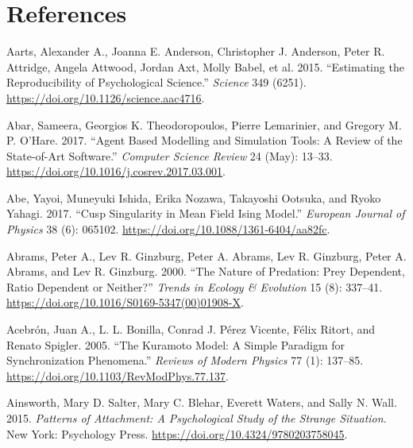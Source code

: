 \documentclass[
  a4paper,
  DIV=11,
  numbers=noendperiod,
  oneside]{scrreprt}
\newlength{\cslhangindent}
\newlength{\cslentryspacingunit} %
\newenvironment{CSLReferences}[2] %
 {%
  \setlength{\parindent}{0pt}
  \ifodd #1
  \let\oldpar\par
  \def\par{\hangindent=\cslhangindent\oldpar}
  \fi
  \setlength{\parskip}{#2\cslentryspacingunit}
 }%
 {}
\begin{document}
\hypertarget{references}{%
\chapter*{References}\label{references}}


\hypertarget{refs}{}
\begin{CSLReferences}{1}{0}
\leavevmode{}%
Aarts, Alexander A., Joanna E. Anderson, Christopher J. Anderson, Peter
R. Attridge, Angela Attwood, Jordan Axt, Molly Babel, et al. 2015.
{``Estimating the Reproducibility of Psychological Science.''}
\emph{Science} 349 (6251).
\url{https://doi.org/10.1126/science.aac4716}.

\leavevmode{}%
Abar, Sameera, Georgios K. Theodoropoulos, Pierre Lemarinier, and
Gregory M. P. O'Hare. 2017. {``Agent {Based Modelling} and {Simulation}
Tools: {A} Review of the State-of-Art Software.''} \emph{Computer
Science Review} 24 (May): 13--33.
\url{https://doi.org/10.1016/j.cosrev.2017.03.001}.

\leavevmode{}%
Abe, Yayoi, Muneyuki Ishida, Erika Nozawa, Takayoshi Ootsuka, and Ryoko
Yahagi. 2017. {``Cusp Singularity in Mean Field {Ising} Model.''}
\emph{European Journal of Physics} 38 (6): 065102.
\url{https://doi.org/10.1088/1361-6404/aa82fc}.

\leavevmode{}%
Abrams, Peter A., Lev R. Ginzburg, Peter A. Abrams, Lev R. Ginzburg,
Peter A. Abrams, and Lev R. Ginzburg. 2000. {``The Nature of Predation:
Prey Dependent, Ratio Dependent or Neither?''} \emph{Trends in Ecology
\& Evolution} 15 (8): 337--41.
\url{https://doi.org/10.1016/S0169-5347(00)01908-X}.

\leavevmode{}%
Acebrón, Juan A., L. L. Bonilla, Conrad J. Pérez Vicente, Félix Ritort,
and Renato Spigler. 2005. {``The {Kuramoto} Model: {A} Simple Paradigm
for Synchronization Phenomena.''} \emph{Reviews of Modern Physics} 77
(1): 137--85. \url{https://doi.org/10.1103/RevModPhys.77.137}.

\leavevmode{}%
Ainsworth, Mary D. Salter, Mary C. Blehar, Everett Waters, and Sally N.
Wall. 2015. \emph{Patterns of {Attachment}: {A Psychological Study} of
the {Strange Situation}}. {New York}: {Psychology Press}.
\url{https://doi.org/10.4324/9780203758045}.


\end{CSLReferences}
\end{document}

